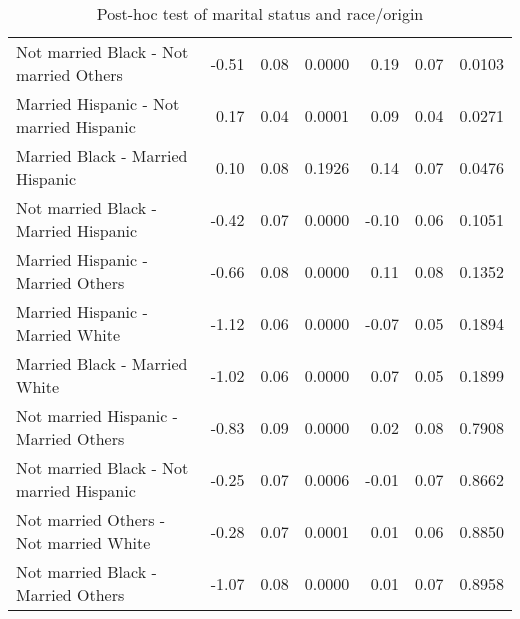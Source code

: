 \begin{table}[H]
\begin{tabular}{lrrrrrr}
    Not married Black 	-  Not married Others & -0.51 & 0.08 & 0.0000 & 0.19 & 0.07 & 0.0103 \\ 
    Married Hispanic 	-  Not married Hispanic & 0.17 & 0.04 & 0.0001 & 0.09 & 0.04 & 0.0271 \\ 
    Married Black 	-  Married Hispanic & 0.10 & 0.08 & 0.1926 & 0.14 & 0.07 & 0.0476 \\ 
    Not married Black 	-  Married Hispanic & -0.42 & 0.07 & 0.0000 & -0.10 & 0.06 & 0.1051 \\ 
    Married Hispanic 	-  Married Others & -0.66 & 0.08 & 0.0000 & 0.11 & 0.08 & 0.1352 \\ 
    Married Hispanic 	-  Married White & -1.12 & 0.06 & 0.0000 & -0.07 & 0.05 & 0.1894 \\ 
    Married Black 	-  Married White & -1.02 & 0.06 & 0.0000 & 0.07 & 0.05 & 0.1899 \\ 
    Not married Hispanic -  Married Others & -0.83 & 0.09 & 0.0000 & 0.02 & 0.08 & 0.7908 \\ 
    Not married Black 	-  Not married Hispanic & -0.25 & 0.07 & 0.0006 & -0.01 & 0.07 & 0.8662 \\ 
    Not married Others 	-  Not married White & -0.28 & 0.07 & 0.0001 & 0.01 & 0.06 & 0.8850 \\ 
    Not married Black 	-  Married Others & -1.07 & 0.08 & 0.0000 & 0.01 & 0.07 & 0.8958 \\ 
  \hline
\end{tabular}
\caption{Post-hoc test of marital status and race/origin} 
\label{tab:RaceOriginMS}
\end{table}

